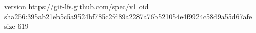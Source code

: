 version https://git-lfs.github.com/spec/v1
oid sha256:395ab21eb5c5a9524bf785c2fd89a2287a76b521054e4f9924c58d9a55d67afe
size 619
